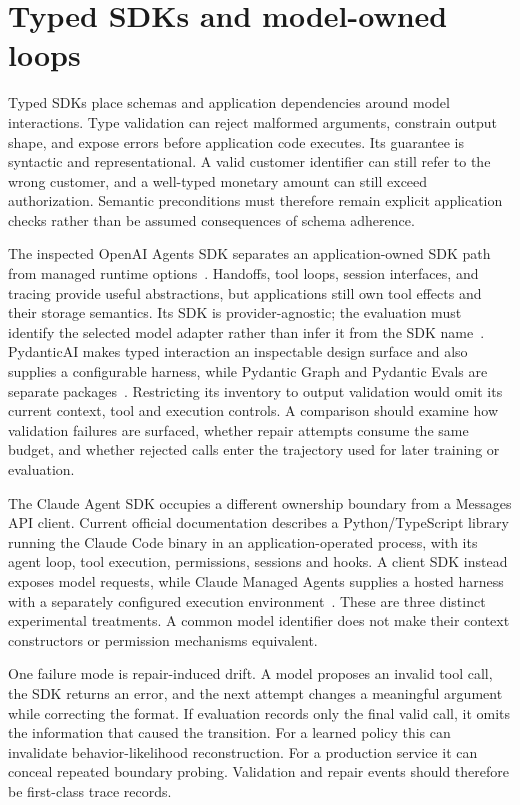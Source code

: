 \section{Typed SDKs and model-owned loops}\label{sec:C22:typed}
Typed SDKs place schemas and application dependencies around model interactions. Type validation can reject malformed arguments, constrain output shape, and expose errors before application code executes. Its guarantee is syntactic and representational. A valid customer identifier can still refer to the wrong customer, and a well-typed monetary amount can still exceed authorization. Semantic preconditions must therefore remain explicit application checks rather than be assumed consequences of schema adherence.

The inspected OpenAI Agents SDK separates an application-owned SDK path from managed runtime options~\cite{openai2026agents}. Handoffs, tool loops, session interfaces, and tracing provide useful abstractions, but applications still own tool effects and their storage semantics. Its SDK is provider-agnostic; the evaluation must identify the selected model adapter rather than infer it from the SDK name~\cite{executionproduct002}. PydanticAI makes typed interaction an inspectable design surface and also supplies a configurable harness, while Pydantic Graph and Pydantic Evals are separate packages~\cite{executionproduct004}. Restricting its inventory to output validation would omit its current context, tool and execution controls. A comparison should examine how validation failures are surfaced, whether repair attempts consume the same budget, and whether rejected calls enter the trajectory used for later training or evaluation.

The Claude Agent SDK occupies a different ownership boundary from a Messages API client. Current official documentation describes a Python/TypeScript library running the Claude Code binary in an application-operated process, with its agent loop, tool execution, permissions, sessions and hooks. A client SDK instead exposes model requests, while Claude Managed Agents supplies a hosted harness with a separately configured execution environment~\cite{cumb2026claudesdk,executionproduct061}. These are three distinct experimental treatments. A common model identifier does not make their context constructors or permission mechanisms equivalent.

One failure mode is repair-induced drift. A model proposes an invalid tool call, the SDK returns an error, and the next attempt changes a meaningful argument while correcting the format. If evaluation records only the final valid call, it omits the information that caused the transition. For a learned policy this can invalidate behavior-likelihood reconstruction. For a production service it can conceal repeated boundary probing. Validation and repair events should therefore be first-class trace records.

